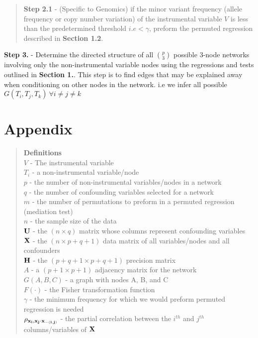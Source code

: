\documentclass[12pt]{report}
\begin{document}
\begin{quote}
\textbf{Step 2.1} - (Specific to Genomics) if the minor variant frequency (allele frequency or copy number variation) of the instrumental variable $V$ is less than the predetermined threshold $i.e < \gamma$, preform the permuted regression described in \textbf{Section 1.2}. 
\end{quote}

\noindent \textbf{Step 3.} -  Determine the directed structure of all $p\choose 3$ possible 3-node networks involving only the non-instrumental variable nodes using the regressions and tests outlined in \textbf{Section 1.}. This step is to find edges that may be explained away when conditioning on other nodes in the network. i.e we infer all possible $G(T_i, T_j, T_k) \ \forall i\neq j\neq k$\\












\newpage
\section*{Appendix}
\begin{quote}
\textbf{Definitions}\\
$V$ - The instrumental variable\\
$T_i$ - a non-instrumental variable/node\\
$p$ - the number of non-instrumental variables/nodes in a network\\
$q$ - the number of confounding variables selected for a network\\
$m$ - the number of permutations to preform in a permuted regression (mediation test)\\
$n$ - the sample size of the data\\
$\bf U$ - the $(n \times q)$ matrix whose columns represent confounding variables\\
$\bf X$ - the $(n \times p+q+1)$ data matrix of all variables/nodes and all confounders\\
$\bf H$ - the $(p+q+1 \times p+q+1)$ precision matrix \\
$A$ - a $(p+1 \times p+1)$ adjacency matrix for the network  \\
$G(A,B,C)$ - a graph with nodes A, B, and C\\
$F(\cdot)$ - the Fisher transformation function\\
$\gamma$ - the minimum frequency for which we would preform  permuted regression is needed\\
$\rho_{\bf x_i,x_j\cdot x_{ -(i,j)}  }$ - the partial correlation between the $i^{th}$ and $j^{th}$ columns/variables of ${\bf X}$
\end{quote}
\end{document}
